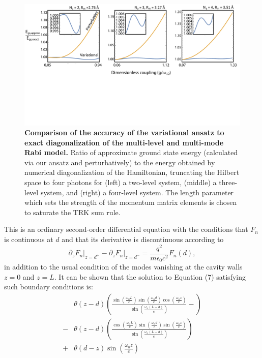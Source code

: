 \documentclass[aps,prb,twocolumn,
	groupedaddress,superscriptaddress,
	amsfonts,amssymb,amsmath,floatfix,
	citeautoscript]{revtex4-1}
\begin{document}
\begin{figure}[t]
\includegraphics[width=16cm]{fig2.pdf}
\caption{\textbf{Comparison of the accuracy of the variational ansatz to exact diagonalization of the multi-level and multi-mode Rabi model.} Ratio of approximate ground state energy (calculated via our ansatz and perturbatively) to the energy obtained by numerical diagonalization of the Hamiltonian, truncating the Hilbert space to four photons for (left) a two-level system, (middle) a three-level system, and (right) a four-level system. The length parameter which sets the strength of the momentum matrix elements is chosen to saturate the TRK sum rule.}
\label{fig:decoupling}
\end{figure}
This is an ordinary second-order differential equation with the conditions that $F_n$ is continuous at $d$ and that its derivative is discontinuous according to 
\begin{equation}
\partial_zF_n\Big|_{z=d^+}-\partial_zF_n\Big|_{z=d^-} = \frac{q^2}{m\epsilon_0 c^2}F_n(d),
\end{equation}
in addition to the usual condition of the modes vanishing at the cavity walls $z=0$ and $z=L$. It can be shown that the solution to Equation (7) satisfying such boundary conditions is:
\begin{align}
&\theta (z-d) \left(\frac{\sin\left(\frac{\omega_nL}{c}\right)\sin\left(\frac{\omega_nd}{c}\right)\cos\left(\frac{\omega_nz}{c}\right)}{\sin\left(\frac{\omega_n(L-d)}{c}\right)}-\right) \nonumber \\ 
-&\theta (z-d) \left(\frac{\cos\left(\frac{\omega_nL}{c}\right)\sin\left(\frac{\omega_nd}{c}\right)\sin\left(\frac{\omega_nz}{c}\right)}{\sin\left(\frac{\omega_n(L-d)}{c}\right)}\right) \nonumber \\ 
+&\theta (d-z) \sin\left(\frac{\omega_n z}{c} \right)
\end{align}
\end{document}

